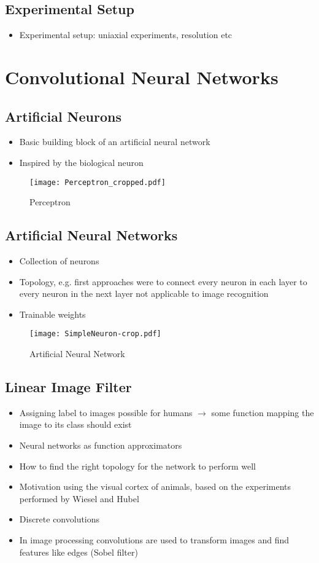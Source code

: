 \documentclass[10pt,a4paper]{report}
\begin{document}
\section{Experimental Setup}
\begin{itemize}
\item Experimental setup: uniaxial experiments, resolution etc
\end{itemize}

\chapter{Convolutional Neural Networks}
\section{Artificial Neurons}
\begin{itemize}
\item Basic building block of an artificial neural network
\item Inspired by the biological neuron
\end{itemize}
\begin{figure}
\centering
  \texttt{[image: Perceptron\_cropped.pdf]}
  \caption{Perceptron}
  \label{fig:Neuron}
\end{figure}
\section{Artificial Neural Networks}
\begin{itemize}
\item Collection of neurons
\item Topology, e.g. first approaches were to connect every neuron in each layer to every neuron in the next layer not applicable to image recognition
\item Trainable weights
\end{itemize}
\begin{figure}
\centering
  \texttt{[image: SimpleNeuron-crop.pdf]}
  \caption{Artificial Neural Network}
  \label{fig:ANN}
\end{figure}
\section{Linear Image Filter}
\begin{itemize}
\item Assigning label to images possible for humans $\rightarrow$ some function mapping the image to its class should exist
\item Neural networks as function approximators
\item How to find the right topology for the network to perform well
\item Motivation using the visual cortex of animals, based on the experiments performed by Wiesel and Hubel
\item Discrete convolutions
\item In image processing convolutions are used to transform images and find features like edges (Sobel filter)
\end{itemize}
\end{document}
